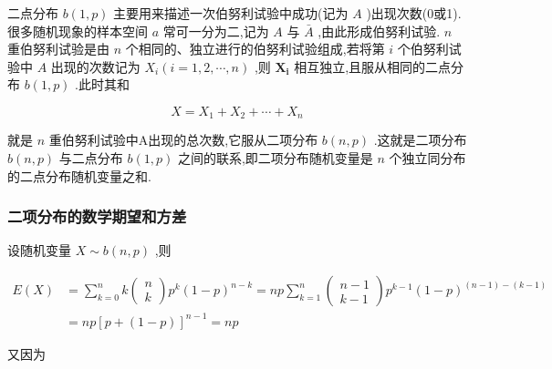 二点分布 $ b(1,p) $ 主要用来描述一次伯努利试验中成功(记为 $ A $ )出现次数(0或1).
很多随机现象的样本空间 $ a $ 常可一分为二,记为 $ A $ 与 $ \bar{A} $ ,由此形成伯努利试验. $ n $ 重伯努利试验是由 $ n $ 个相同的、独立进行的伯努利试验组成,若将第 $ i $ 个伯努利试验中 $ A $ 出现的次数记为 $ X_{i}(i=1,2, \cdots, n) $ ,则 $ \boldsymbol{X}_{\mathbf{i}} $ 相互独立,且服从相同的二点分布 $ b(1,p) $ .此时其和

\[
X=X_{1}+X_{2}+\cdots+X_{n}
\]

就是 $ n $ 重伯努利试验中A出现的总次数,它服从二项分布 $ b(n,p) $ .这就是二项分布 $ b(n,p) $ 与二点分布 $ b(1,p) $ 之间的联系,即二项分布随机变量是 $ n $ 个独立同分布的二点分布随机变量之和.

\subsubsection{二项分布的数学期望和方差}

设随机变量 $ X \sim b(n, p) $ ,则

\[
\begin{aligned} E(X) &=\sum_{k=0}^{n} k \left( \begin{array}{c}{n} \\ {k}\end{array}\right) p^{k}(1-p)^{n-k}=n p \sum_{k=1}^{n} \left( \begin{array}{c}{n-1} \\ {k-1}\end{array}\right) p^{k-1}(1-p)^{(n-1)-(k-1)} \\ &=n p[p+(1-p)]^{n-1}=n p \end{aligned}
\]

又因为

